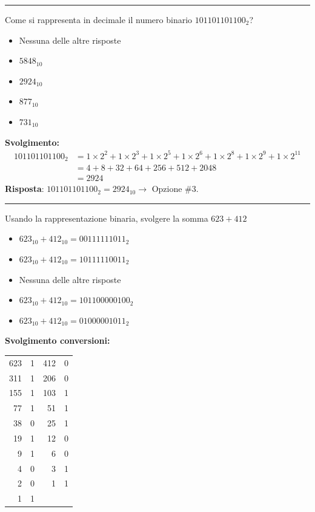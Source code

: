 \documentclass[12pt, a4paper]{article}
\begin{document}
\vspace{0.5cm}
\hrule
\vspace{0.5cm}

Come si rappresenta in decimale il numero binario $101101101100_2$?
\begin{itemize}
    \item[$\square$] Nessuna delle altre risposte
    \item[$\square$] $5848_{10}$
    \item[$\blacksquare$] $2924_{10}$
    \item[$\square$] $877_{10}$
    \item[$\square$] $731_{10}$
\end{itemize}

\textbf{Svolgimento:}
\begin{align*}
101101101100_2 &= 1\times2^{2} + 1\times2^{3} + 1\times2^{5} + 1\times2^{6} + 1\times2^{8} + 1\times2^{9} + 1\times2^{11} \\
&= 4 + 8 + 32 + 64 + 256 + 512 + 2048 \\
&= 2924
\end{align*}
\textbf{Risposta}: $101101101100_2 = 2924_{10} \rightarrow$ Opzione \#3.

\vspace{0.5cm}
\hrule
\vspace{0.5cm}

Usando la rappresentazione binaria, svolgere la somma $623+412$
\begin{itemize}
    \item[$\square$] $623_{10}+412_{10} = 00111111011_2$
    \item[$\square$] $623_{10}+412_{10} = 10111110011_2$
    \item[$\square$] Nessuna delle altre risposte
    \item[$\square$] $623_{10}+412_{10} = 101100000100_2$
    \item[$\blacksquare$] $623_{10}+412_{10} = 01000001011_2$
\end{itemize}

\textbf{Svolgimento conversioni:}
\begin{center}
\begin{tabular}{r|c@{\hskip 1in}r|c}
623 & 1 & 412 & 0 \\
311 & 1 & 206 & 0 \\
155 & 1 & 103 & 1 \\
77  & 1 &  51 & 1 \\
38  & 0 &  25 & 1 \\
19  & 1 &  12 & 0 \\
9   & 1 &   6 & 0 \\
4   & 0 &   3 & 1 \\
2   & 0 &   1 & 1 \\
1   & 1 &     & 
\end{tabular}
\end{center}
\end{document}
